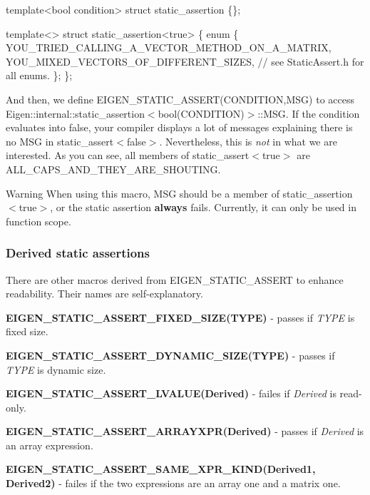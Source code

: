 \begin{DoxyCode}
\textcolor{keyword}{template}<\textcolor{keywordtype}{bool} condition>
\textcolor{keyword}{struct }static\_assertion \{\};

\textcolor{keyword}{template}<>
\textcolor{keyword}{struct }static\_assertion<true>
\{
  \textcolor{keyword}{enum} \{
    YOU\_TRIED\_CALLING\_A\_VECTOR\_METHOD\_ON\_A\_MATRIX,
    YOU\_MIXED\_VECTORS\_OF\_DIFFERENT\_SIZES,
    \textcolor{comment}{// see StaticAssert.h for all enums.}
  \};
\};
\end{DoxyCode}


And then, we define E\+I\+G\+E\+N\+\_\+\+S\+T\+A\+T\+I\+C\+\_\+\+A\+S\+S\+E\+R\+T(\+C\+O\+N\+D\+I\+T\+I\+O\+N,\+M\+S\+G) to access Eigen\+::internal\+::static\+\_\+assertion$<$bool(\+C\+O\+N\+D\+I\+T\+I\+O\+N)$>$\+::\+M\+SG. If the condition evaluates into {\ttfamily false}, your compiler displays a lot of messages explaining there is no M\+SG in static\+\_\+assert$<$false$>$. Nevertheless, this is {\itshape not} in what we are interested. As you can see, all members of static\+\_\+assert$<$true$>$ are A\+L\+L\+\_\+\+C\+A\+P\+S\+\_\+\+A\+N\+D\+\_\+\+T\+H\+E\+Y\+\_\+\+A\+R\+E\+\_\+\+S\+H\+O\+U\+T\+I\+NG.

\begin{DoxyWarning}{Warning}
When using this macro, M\+SG should be a member of static\+\_\+assertion$<$true$>$, or the static assertion {\bfseries always} fails. Currently, it can only be used in function scope.
\end{DoxyWarning}
\hypertarget{_topic_assertions_DerivedStaticAssert}{}\subsubsection{Derived static assertions}\label{_topic_assertions_DerivedStaticAssert}
There are other macros derived from E\+I\+G\+E\+N\+\_\+\+S\+T\+A\+T\+I\+C\+\_\+\+A\+S\+S\+E\+RT to enhance readability. Their names are self-\/explanatory.


\begin{DoxyItemize}
\item {\bfseries E\+I\+G\+E\+N\+\_\+\+S\+T\+A\+T\+I\+C\+\_\+\+A\+S\+S\+E\+R\+T\+\_\+\+F\+I\+X\+E\+D\+\_\+\+S\+I\+Z\+E(\+T\+Y\+P\+E)} -\/ passes if {\itshape T\+Y\+PE} is fixed size.
\item {\bfseries E\+I\+G\+E\+N\+\_\+\+S\+T\+A\+T\+I\+C\+\_\+\+A\+S\+S\+E\+R\+T\+\_\+\+D\+Y\+N\+A\+M\+I\+C\+\_\+\+S\+I\+Z\+E(\+T\+Y\+P\+E)} -\/ passes if {\itshape T\+Y\+PE} is dynamic size.
\item {\bfseries E\+I\+G\+E\+N\+\_\+\+S\+T\+A\+T\+I\+C\+\_\+\+A\+S\+S\+E\+R\+T\+\_\+\+L\+V\+A\+L\+U\+E(\+Derived)} -\/ failes if {\itshape Derived} is read-\/only.
\item {\bfseries E\+I\+G\+E\+N\+\_\+\+S\+T\+A\+T\+I\+C\+\_\+\+A\+S\+S\+E\+R\+T\+\_\+\+A\+R\+R\+A\+Y\+X\+P\+R(\+Derived)} -\/ passes if {\itshape Derived} is an array expression.
\item {\bfseries E\+I\+G\+E\+N\+\_\+\+S\+T\+A\+T\+I\+C\+\_\+\+A\+S\+S\+E\+R\+T\+\_\+\+S\+A\+M\+E\+\_\+\+X\+P\+R\+\_\+\+K\+I\+N\+D(\+Derived1, Derived2)} -\/ failes if the two expressions are an array one and a matrix one.
\end{DoxyItemize}

